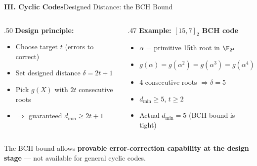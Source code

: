 \begin{frame}{\textbf{III. Cyclic Codes}}{Designed Distance: the BCH Bound}


\medskip
\begin{columns}[T]
  \begin{column}{.50\textwidth}
    \textbf{Design principle:}
    \begin{itemize}\small
      \item Choose target $t$ (errors to correct)
      \item Set designed distance $\delta = 2t+1$
      \item Pick $g(X)$ with $2t$ consecutive roots
      \item $\Rightarrow$ guaranteed $d_{\min}\geq 2t+1$
    \end{itemize}
  \end{column}
  \begin{column}{.47\textwidth}
    \textbf{Example: $[15,7]_2$ BCH code}
    \begin{itemize}\small
      \item $\alpha$ = primitive 15th root in $\F_{2^4}$
      \item $g(\alpha)=g(\alpha^2)=g(\alpha^3)=g(\alpha^4)=0$
      \item 4 consecutive roots $\Rightarrow\delta=5$
      \item $d_{\min}\geq 5$,\; $t\geq 2$
      \item Actual $d_{\min}=5$ (BCH bound is tight)
    \end{itemize}
  \end{column}
\end{columns}

\medskip
\begin{block}{}
\small The BCH bound allows \textbf{provable error-correction capability at the design stage} — not available for general cyclic codes.
\end{block}
\end{frame}
